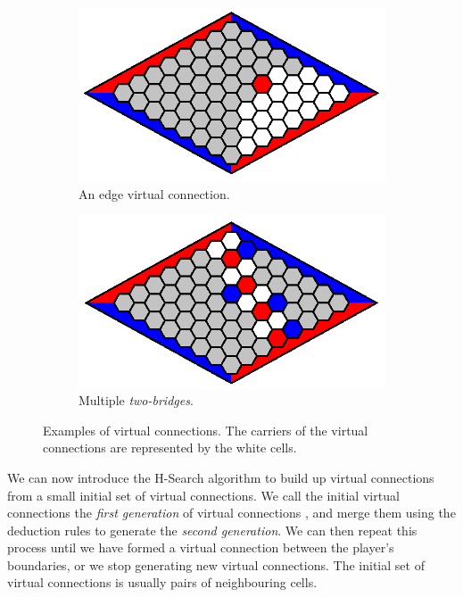 \begin{figure}
\centering
\begin{subfigure}{.5\textwidth}
  \centering
  \includegraphics[width=0.94\linewidth]{images/BIG_VC.png}
  \caption{An edge virtual connection.}
  \label{fig:sub1}
\end{subfigure}%
\begin{subfigure}{.5\textwidth}
  \centering
  \includegraphics[width=0.95\linewidth]{images/SMALL_VC.png}
  \caption{Multiple \textit{two-bridges}.}
  \label{fig:sub2}
\end{subfigure}
\caption{Examples of virtual connections. The carriers of the virtual connections are represented by the white cells.}
\label{fig:test}
\end{figure}



We can now introduce the H-Search algorithm to build up virtual connections from a small initial set of virtual connections. We call the initial virtual connections the \textit{first generation} of virtual connections \cite{HierarchicalHex}, and merge them using the deduction rules to generate the \textit{second generation}. We can then repeat this process until we have formed a virtual connection between the player's boundaries, or we stop generating new virtual connections. The initial set of virtual connections is usually pairs of neighbouring cells.

